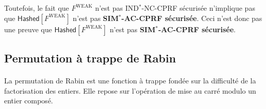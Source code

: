 \documentclass[9pt]{extarticle}
\begin{document}
Toutefois, le fait que $F^{\text{WEAK}}$ n'est pas IND$^*$-NC-CPRF sécurisée n'implique pas que $\textsf{Hashed}[F^{\text{WEAK}}]$ n'est pas \textbf{SIM$^*$-AC-CPRF sécurisée}. Ceci n'est donc pas une preuve que $\textsf{Hashed}[F^{\text{WEAK}}]$ n'est pas \textbf{SIM$^*$-AC-CPRF sécurisée}.

\subsection{Permutation à trappe de Rabin}

\paragraph{}La permutation de Rabin est une fonction à trappe fondée sur la difficulté de la factorisation des entiers. Elle repose sur l'opération de mise au carré modulo un entier composé.
\end{document}
